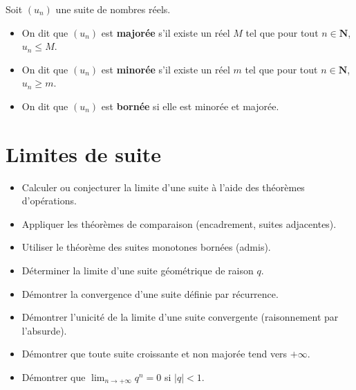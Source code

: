 \documentclass[11pt,a4paper,openany]{book}
\theoremstyle{definition}
\newcommand{\nchap}{
    \setcounter{Définition}{0}
    \setcounter{Propriété}{0}
    \setcounter{Théorème}{0}
    \setcounter{Remarque}{0}
    \setcounter{Exemple}{0}
}
\begin{document}
    \begin{Définition}
        Soit $(u_n)$ une suite de nombres réels.
        \begin{itemize}
            \item On dit que $(u_n)$ est \textbf{majorée} s'il existe un réel $M$ tel que
                  pour tout $n\in\mathbf{N}$, $u_n\leq M$.
            \item On dit que $(u_n)$ est \textbf{minorée} s'il existe un réel $m$ tel que
                  pour tout $n\in\mathbf{N}$, $u_n\geq m$.
            \item On dit que $(u_n)$ est \textbf{bornée} si elle est minorée et majorée.
        \end{itemize}
    \end{Définition}

    \chapter{Limites de suite}
    \nchap

    \begin{capacitesbox}
    \begin{itemize}
        \item Calculer ou conjecturer la limite d'une suite à l'aide des théorèmes d'opérations.
        \item Appliquer les théorèmes de comparaison (encadrement, suites adjacentes).
        \item Utiliser le théorème des suites monotones bornées (admis).
        \item Déterminer la limite d'une suite géométrique de raison $q$.
        \item Démontrer la convergence d'une suite définie par récurrence.
    \end{itemize}
    \end{capacitesbox}

    \begin{demoprogbox}
    \begin{itemize}
        \item Démontrer l'unicité de la limite d'une suite convergente (raisonnement par l'absurde).
        \item Démontrer que toute suite croissante et non majorée tend vers $+\infty$.
        \item Démontrer que $\displaystyle\lim_{n\to+\infty}q^n=0$ si $|q|<1$.
    \end{itemize}
    \end{demoprogbox}
\end{document}
